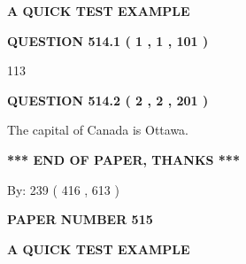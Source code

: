 \documentclass[12pt]{article}
\begin{document}
   
 \vspace{0.2in}
{\LARGE {\textbf{ A QUICK TEST EXAMPLE}}}
   
   
  
\vspace{0.2in}
  
{\textbf{\Large{QUESTION
514.1 
 ( 1 , 1 , 101 )
}}}
  
  
 
 
\noindent{}

113
 
 
  
\vspace{0.2in}
  
{\textbf{\Large{QUESTION
514.2 
 ( 2 , 2 , 201 )
}}}
  
  
 
 
\noindent{}
 
 
The capital of Canada is Ottawa.
 
 
 
 
   
   
 \vspace{0.2in}
 
   
   
   
   
\vspace{1.0in} 
{\textbf{\large{ *** END OF PAPER, THANKS *** }}} 
   
   
\hspace{1.0in} By: 
 239 ( 416 ,  613 )
   
   
   
   
\newpage 
\setcounter{page}{ 
   515001 } 
   
   
   
   
 {\textbf{ \Large{ PAPER NUMBER  515  }}}
   
   
\vspace{0.2in}
   
   
   
   
   
   
 \vspace{0.2in}
{\LARGE {\textbf{ A QUICK TEST EXAMPLE}}}
   
   
  
\vspace{0.2in}
  
\end{document}

